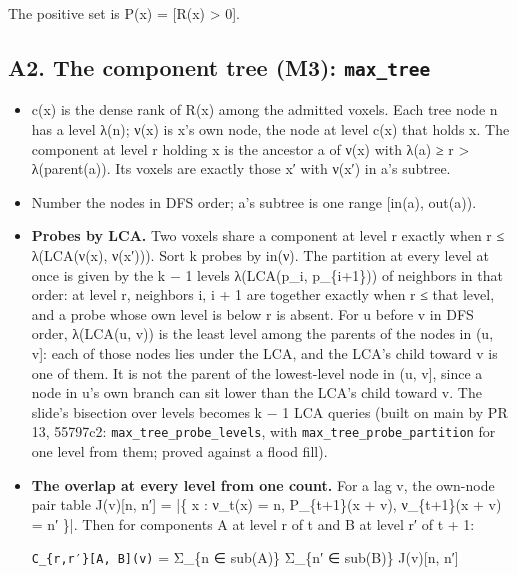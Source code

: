 The positive set is P(x) = [R(x) > 0].

\subsection{\texorpdfstring{A2. The component tree (M3): \texttt{max\_\allowbreak{}tree}}{A2. The component tree (M3): max\_tree}}

\begin{itemize}
\item c(x) is the dense rank of R(x) among the admitted voxels. Each tree node n has a level λ(n); ν(x) is x's own node, the node at level c(x) that holds x. The component at level r holding x is the ancestor a of ν(x) with λ(a) ≥ r > λ(parent(a)). Its voxels are exactly those x′ with ν(x′) in a's subtree.
\item Number the nodes in DFS order; a's subtree is one range [in(a), out(a)).
\item \textbf{Probes by LCA.} Two voxels share a component at level r exactly when r ≤ λ(LCA(ν(x), ν(x′))). Sort k probes by in(ν). The partition at every level at once is given by the k − 1 levels λ(LCA(p\_\allowbreak{}i, p\_\allowbreak{}\{i+1\})) of neighbors in that order: at level r, neighbors i, i + 1 are together exactly when r ≤ that level, and a probe whose own level is below r is absent. For u before v in DFS order, λ(LCA(u, v)) is the least level among the parents of the nodes in (u, v]: each of those nodes lies under the LCA, and the LCA's child toward v is one of them. It is not the parent of the lowest-level node in (u, v], since a node in u's own branch can sit lower than the LCA's child toward v. The slide's bisection over levels becomes k − 1 LCA queries (built on main by PR 13, 55797c2: \texttt{max\_\allowbreak{}tree\_\allowbreak{}probe\_\allowbreak{}levels}, with \texttt{max\_\allowbreak{}tree\_\allowbreak{}probe\_\allowbreak{}partition} for one level from them; proved against a flood fill).
\item \textbf{The overlap at every level from one count.} For a lag v, the own-node pair table J(v)[n, n′] = |\{ x : ν\_\allowbreak{}t(x) = n, P\_\allowbreak{}\{t+1\}(x + v), ν\_\allowbreak{}\{t+1\}(x + v) = n′ \}|. Then for components A at level r of t and B at level r′ of t + 1:

\texttt{C\_\allowbreak{}\{r,r′\}[A, B](v)} = Σ\_\allowbreak{}\{n ∈ sub(A)\} Σ\_\allowbreak{}\{n′ ∈ sub(B)\} J(v)[n, n′]


\end{itemize}

